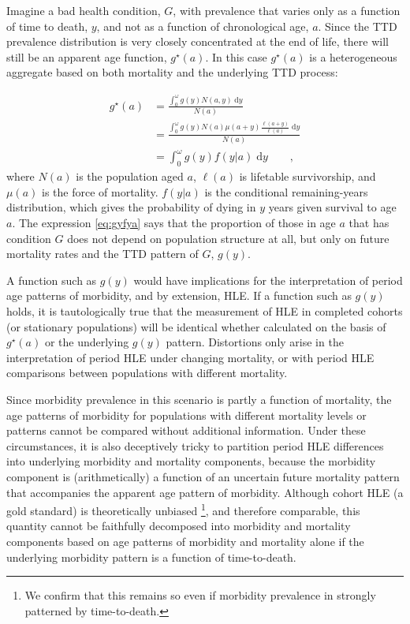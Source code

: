 \documentclass[11pt,oneside,a4paper]{article} %
\newcommand{\dd}{\; \mathrm{d}}
\newcommand{\tc}{\quad\quad\text{,}}
\begin{document}
 \FloatBarrier
 
Imagine a bad health condition, $G$, with prevalence that varies only as a
function of time to death, $y$, and not as a function of chronological age, $a$.
Since the TTD prevalence distribution is very closely concentrated at the end of life, there will still be an apparent age function,
$g^\star(a)$.
In this case $g^\star(a)$ is a heterogeneous aggregate based on both mortality
and the underlying TTD process:
 
\begin{align}
g^\star(a) &= \frac{\int _0^\omega g(y) N(a,y) \dd y}{N(a)} \\
      &= \frac{\int _0^\omega g(y) N(a)
      \mu(a+y)\frac{\ell(a+y)}{\ell(a)}\dd y}{N(a)}\\
      &= \int _0^\omega g(y) f(y|a)\dd y \label{eq:gyfya}\tc
\end{align}
where $N(a)$ is the population aged $a$, $\ell(a)$ is lifetable survivorship, and
$\mu(a)$ is the force of mortality. $f(y|a)$ is the conditional remaining-years
distribution, which gives the probability of dying in $y$ years given survival
to age $a$. The expression \eqref{eq:gyfya} says that the proportion of those in
age $a$ that has condition $G$ does not depend on population structure at all, but only on future mortality rates and the TTD pattern of $G$, $g(y)$. 

A function such as $g(y)$ would have implications for the interpretation of
period age patterns of morbidity, and by extension, HLE. If a function such as $g(y)$ holds, it is tautologically true that the
measurement of HLE in completed cohorts (or stationary populations)
will be identical whether calculated on the basis of $g^\star(a)$ or the
underlying $g(y)$ pattern. Distortions only arise in the interpretation of
period HLE under changing mortality, or with period HLE comparisons between
populations with different mortality. 


Since morbidity prevalence in this scenario is partly a function of mortality,
 the age patterns of morbidity for populations with different mortality
levels or patterns cannot be compared without additional information. Under
these circumstances, it is also deceptively tricky to partition period HLE
differences into underlying morbidity and mortality components, because the
morbidity component is (arithmetically) a function of an uncertain future mortality pattern
that accompanies the apparent age pattern of morbidity. Although cohort HLE (a
gold standard) is theoretically unbiased \citep{imai2007estimation}\footnote{We confirm that this remains so even if morbidity prevalence in strongly patterned by time-to-death.}, and therefore comparable, this quantity cannot be faithfully
decomposed into morbidity and mortality components based on age patterns of morbidity and mortality alone if
the underlying morbidity pattern is a function of time-to-death.
\end{document}
